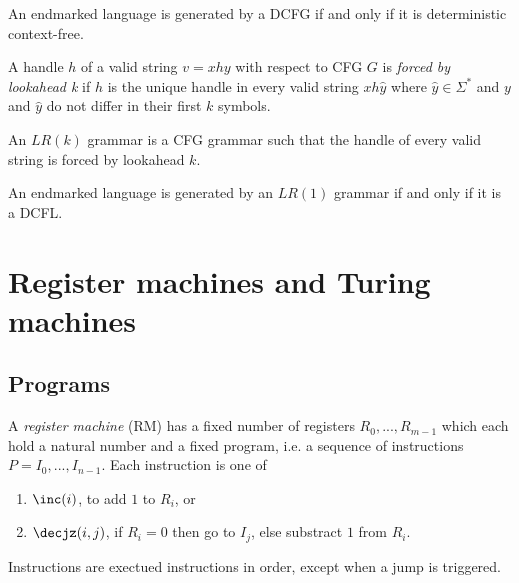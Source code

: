 \documentclass{article}
\begin{document}
\begin{theorem}
    An endmarked language is generated by a DCFG if and only if it is deterministic context-free.
\end{theorem}

\begin{definition}
    A handle $h$ of a valid string $v=xhy$ with respect to CFG $G$ is \emph{forced by lookahead k}
    if $h$ is the unique handle in every valid string $xh\hat y$ where $\hat y\in\Sigma^*$ and
    $y$ and $\hat y$ do not differ in their first $k$ symbols.

    An $LR(k)$ grammar is a CFG grammar such that the handle of every valid string is forced by
    lookahead $k$.
\end{definition}

\begin{theorem}[Sipser p. 154]
    An endmarked language is generated by an $LR(1)$ grammar if and only if it is a DCFL.
\end{theorem}

\section{Register machines and Turing machines}

\subsection{Programs}

\begin{definition}[Notes I.1]
    A \emph{register machine} (RM) has a fixed number of registers $R_0,...,R_{m-1}$
    which each hold a natural number and a fixed program, i.e. a sequence of
    instructions $P=I_0,...,I_{n-1}$. Each instruction is one of
    \begin{enumerate}
        \item $\inc(i)$, to add $1$ to $R_i$, or
        \item $\decjz(i,j)$, if $R_i=0$ then go to $I_j$, else substract $1$ from $R_i$.
    \end{enumerate}
    Instructions are exectued instructions in order, except when
    a jump is triggered.
\end{definition}
\end{document}
